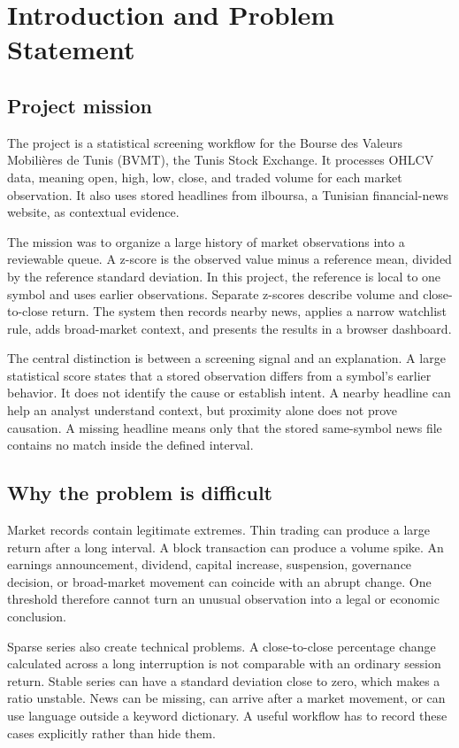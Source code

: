 \chapter{Introduction and Problem Statement}

\section{Project mission}

The project is a statistical screening workflow for the Bourse des Valeurs
Mobilières de Tunis (BVMT), the Tunis Stock Exchange. It processes OHLCV data,
meaning open, high, low, close, and traded volume for each market observation.
It also uses stored headlines from ilboursa, a Tunisian financial-news website,
as contextual evidence.

The mission was to organize a large history of market observations into a
reviewable queue. A z-score is the observed value minus a reference mean,
divided by the reference standard deviation. In this project, the reference is
local to one symbol and uses earlier observations. Separate z-scores describe
volume and close-to-close return. The system then records nearby news, applies
a narrow watchlist rule, adds broad-market context, and presents the results in
a browser dashboard.

The central distinction is between a screening signal and an explanation. A
large statistical score states that a stored observation differs from a
symbol's earlier behavior. It does not identify the cause or establish intent.
A nearby headline can help an analyst understand context, but proximity alone
does not prove causation. A missing headline means only that the stored
same-symbol news file contains no match inside the defined interval.

\section{Why the problem is difficult}

Market records contain legitimate extremes. Thin trading can produce a large
return after a long interval. A block transaction can produce a volume spike.
An earnings announcement, dividend, capital increase, suspension, governance
decision, or broad-market movement can coincide with an abrupt change. One
threshold therefore cannot turn an unusual observation into a legal or
economic conclusion.

Sparse series also create technical problems. A close-to-close percentage
change calculated across a long interruption is not comparable with an
ordinary session return. Stable series can have a standard deviation close to
zero, which makes a ratio unstable. News can be missing, can arrive after a
market movement, or can use language outside a keyword dictionary. A useful
workflow has to record these cases explicitly rather than hide them.

